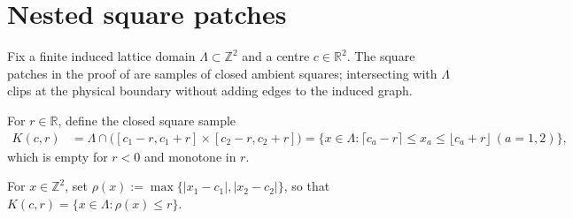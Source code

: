 \section{Nested square patches}
\label{sec:peps_nested_patch_geometry}

Fix a finite induced lattice domain $\Lambda\subset\mathbb Z^2$ and a centre
$c\in\mathbb R^2$. The square patches in the proof of
\cite[Proposition~4.1]{OpenAI2026PolynomialPEPS} are samples of closed ambient
squares; intersecting with $\Lambda$ clips at the physical boundary without
adding edges to the induced graph.

\begin{definition}
    \label{def:peps_closed_square_sample}
    \leanok
    For $r\in\mathbb R$, define the closed square sample
    \begin{align}
        K(c,r) & =\Lambda\cap
        \bigl([c_1-r,c_1+r]\times[c_2-r,c_2+r]\bigr)
        = \{x\in\Lambda:\lceil c_a-r\rceil\le x_a\le\lfloor c_a+r\rfloor\ (a=1,2)\},
        \label{eq:peps_closed_square_sample}
    \end{align}
    which is empty for $r<0$ and monotone in $r$.
\end{definition}

\begin{definition}
    \label{def:peps_square_radius}
    \leanok
    For $x\in\mathbb Z^2$, set $\rho(x):=\max\{|x_1-c_1|,|x_2-c_2|\}$, so that $K(c,r)=\{x\in\Lambda:\rho(x)\le r\}$.
\end{definition}

